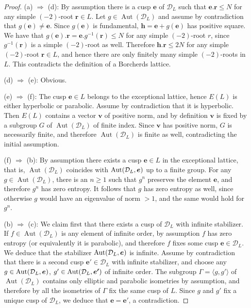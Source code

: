 \documentclass[11pt,letterpaper]{amsart}
\newcommand{\vect}[1]{\boldsymbol{#1}}
\DeclareMathOperator{\Aut}{Aut}
\begin{document}
\begin{proof}
    (a) $\Rightarrow$ (d): By assumption there is a cusp $\vect{e}$ of $\mathcal{D}_L$ such that $\vect{e}.\vect{r} \le N$ for any simple $(-2)$-root $\vect{r}\in L$. Let $g\in \Aut(\mathcal{D}_L)$ and assume by contradiction that $g(\vect{e})\ne \vect{e}$. Since $g(\vect{e})$ is fundamental, $\vect{h}=\vect{e}+g(\vect{e})$ has positive square.
    We have that $g(\vect{e}).\vect{r}=\vect{e}.g^{-1}(\vect{r}) \le N$ for any simple $(-2)$-root $r$, since $g^{-1}(\vect{r})$ is a simple $(-2)$-root as well. Therefore $\vect{h}.\vect{r}\le 2N$ for any simple $(-2)$-root $\vect{r}\in L$, and hence there are only finitely many simple $(-2)$-roots in $L$. This contradicts the definition of a Borcherds lattice.
    
    (d) $\Rightarrow$ (e): Obvious.
    
    (e) $\Rightarrow$ (f): The cusp $\vect{e}\in L$ belongs to the exceptional lattice, hence $E(L)$ is either hyperbolic or parabolic. Assume by contradiction that it is hyperbolic. Then $E(L)$ contains a vector $\vect{v}$ of positive norm, and by definition $\vect{v}$ is fixed by a subgroup $G$ of $\Aut(\mathcal{D}_L)$ of finite index. Since $\vect{v}$ has positive norm, $G$ is necessarily finite, and therefore $\Aut(\mathcal{D}_L)$ is finite as well, contradicting the initial assumption.
    
    (f) $\Rightarrow$ (b): By assumption there exists a cusp $\vect{e}\in L$ in the exceptional lattice, that is, $\Aut(\mathcal{D}_L)$ coincides with $\Stabe$ up to a finite group. For any $g\in \Aut(\mathcal{D}_L)$, there is an $n\ge 1$ such that $g^n$ preserves the element $\vect{e}$, and therefore $g^n$ has zero entropy. It follows that $g$ has zero entropy as well, since otherwise $g$ would have an eigenvalue of norm $>1$, and the same would hold for $g^n$.

    (b) $\Rightarrow$ (c): We claim first that there exists a cusp of $\mathcal{D}_L$ with infinite stabilizer. If $f\in \Aut(\mathcal{D}_L)$ is any element of infinite order, by assumption $f$ has zero entropy (or equivalently it is parabolic), and therefore $f$ fixes some cusp $\vect{e}\in \mathcal{D}_L$. We deduce that the stabilizer $\Stabe$ is infinite.
    Assume by contradiction that there is a second cusp $\vect{e'}\in \mathcal{D}_L$ with infinite stabilizer, and choose any $g\in \Stabe$, $g'\in \Stabee$ of infinite order. The subgroup $\Gamma=\langle g,g'\rangle$ of $\Aut(\mathcal{D}_L)$ contains only elliptic and parabolic isometries by assumption, and therefore by \cite[Theorem~12.2.3]{ratcliffe} all the isometries of $\Gamma$ fix the same cusp of $L$. Since $g$ and $g'$ fix a unique cusp of $\mathcal{D}_L$, we deduce that $\vect{e}=\vect{e'}$, a contradiction.
    

\end{proof}
\end{document}
